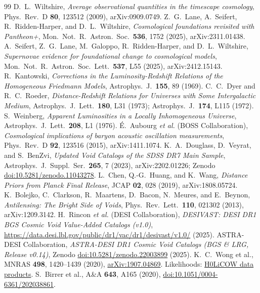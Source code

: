\documentclass[11pt,a4paper]{article}
\begin{document}
\begin{thebibliography}{99}
 D.~L.~Wiltshire, \textit{Average observational quantities in the timescape cosmology}, Phys.\ Rev.\ D \textbf{80}, 123512 (2009), arXiv:0909.0749.
 Z.~G.~Lane, A.~Seifert, R.~Ridden-Harper, and D.~L.~Wiltshire, \textit{Cosmological foundations revisited with Pantheon+}, Mon.\ Not.\ R.\ Astron.\ Soc.\ \textbf{536}, 1752 (2025), arXiv:2311.01438.
 A.~Seifert, Z.~G.~Lane, M.~Galoppo, R.~Ridden-Harper, and D.~L.~Wiltshire, \textit{Supernovae evidence for foundational change to cosmological models}, Mon.\ Not.\ R.\ Astron.\ Soc.\ Lett.\ \textbf{537}, L55 (2025), arXiv:2412.15143.
 R.~Kantowski, \textit{Corrections in the Luminosity-Redshift Relations of the Homogeneous Friedmann Models}, Astrophys.\ J.\ \textbf{155}, 89 (1969).
 C.~C.~Dyer and R.~C.~Roeder, \textit{Distance-Redshift Relations for Universes with Some Intergalactic Medium}, Astrophys.\ J.\ Lett.\ \textbf{180}, L31 (1973); Astrophys.\ J.\ \textbf{174}, L115 (1972).
 S.~Weinberg, \textit{Apparent Luminosities in a Locally Inhomogeneous Universe}, Astrophys.\ J.\ Lett.\ \textbf{208}, L1 (1976).
 \'E.~Aubourg \textit{et al.} (BOSS Collaboration), \textit{Cosmological implications of baryon acoustic oscillation measurements}, Phys.\ Rev.\ D \textbf{92}, 123516 (2015), arXiv:1411.1074.
 K.~A.~Douglass, D.~Veyrat, and S.~BenZvi, \textit{Updated Void Catalogs of the SDSS DR7 Main Sample}, Astrophys.\ J.\ Suppl.\ Ser.\ \textbf{265}, 7 (2023), arXiv:2202.01226; Zenodo \href{https://doi.org/10.5281/zenodo.11043278}{doi:10.5281/zenodo.11043278}.
 L.~Chen, Q.-G.~Huang, and K.~Wang, \textit{Distance Priors from Planck Final Release}, JCAP \textbf{02}, 028 (2019), arXiv:1808.05724.
 K.~Bolejko, C.~Clarkson, R.~Maartens, D.~Bacon, N.~Meures, and E.~Beynon, \textit{Antilensing: The Bright Side of Voids}, Phys.\ Rev.\ Lett.\ \textbf{110}, 021302 (2013), arXiv:1209.3142.
 H.~Rincon \textit{et al.} (DESI Collaboration), \textit{DESIVAST: DESI DR1 BGS Cosmic Void Value-Added Catalogs (v1.0)}, \url{https://data.desi.lbl.gov/public/dr1/vac/dr1/desivast/v1.0/} (2025).
 ASTRA-DESI Collaboration, \textit{ASTRA-DESI DR1 Cosmic Void Catalogs (BGS \& LRG, Release v0.14)}, Zenodo \href{https://doi.org/10.5281/zenodo.22003899}{doi:10.5281/zenodo.22003899} (2025).
 K.~C.~Wong et al., MNRAS \textbf{498}, 1420--1439 (2020),
 \href{https://arxiv.org/abs/1907.04869}{arXiv:1907.04869}.
 Likelihoods: \href{https://shsuyu.github.io/H0LiCOW/site/h0licow_data.html}{H0LiCOW data products}.
 S.~Birrer et al., A\&A \textbf{643}, A165 (2020),
 \href{https://doi.org/10.1051/0004-6361/202038861}{doi:10.1051/0004-6361/202038861}.
\end{thebibliography}
\end{document}
